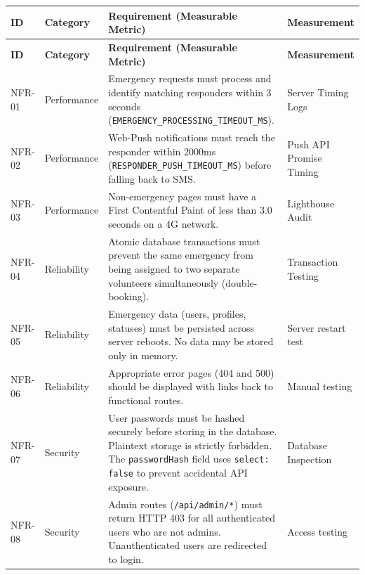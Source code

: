 \documentclass[12pt,a4paper]{article}
\begin{document}
\begin{longtable}{|p{1.3cm}|p{2.3cm}|p{8cm}|p{2.5cm}|}
\hline
\rowcolor{lightorange}
\textbf{ID} & \textbf{Category} & \textbf{Requirement (Measurable Metric)} & \textbf{Measurement} \\
\hline
\endfirsthead
\hline
\rowcolor{lightorange}
\textbf{ID} & \textbf{Category} & \textbf{Requirement (Measurable Metric)} & \textbf{Measurement} \\
\hline
\endhead

NFR-01 & Performance &
Emergency requests must process and identify matching responders within 3 seconds (\texttt{EMERGENCY\_PROCESSING\_TIMEOUT\_MS}). &
Server Timing Logs \\
\hline

NFR-02 & Performance &
Web-Push notifications must reach the responder within 2000ms (\texttt{RESPONDER\_PUSH\_TIMEOUT\_MS}) before falling back to SMS. &
Push API Promise Timing \\
\hline

NFR-03 & Performance &
Non-emergency pages must have a First Contentful Paint of less than 3.0 seconds on a 4G network. &
Lighthouse Audit \\
\hline

NFR-04 & Reliability &
Atomic database transactions must prevent the same emergency from being assigned to two separate volunteers simultaneously (double-booking). &
Transaction Testing \\
\hline

NFR-05 & Reliability &
Emergency data (users, profiles, statuses) must be persisted across server reboots. No data may be stored only in memory. &
Server restart test \\
\hline

NFR-06 & Reliability &
Appropriate error pages (404 and 500) should be displayed with links back to functional routes. &
Manual testing \\
\hline

NFR-07 & Security &
User passwords must be hashed securely before storing in the database. Plaintext storage is strictly forbidden. The \texttt{passwordHash} field uses \texttt{select: false} to prevent accidental API exposure. &
Database Inspection \\
\hline

NFR-08 & Security &
Admin routes (\texttt{/api/admin/*}) must return HTTP 403 for all authenticated users who are not admins. Unauthenticated users are redirected to login. &
Access testing \\
\hline


\end{longtable}
\end{document}
